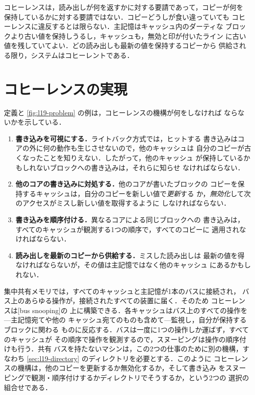 \documentclass[../main.tex]{subfiles}
\begin{document}
\begin{note}
  コヒーレンスは，読み出しが何を返すかに対する要請であって，コピーが何を
  保持しているかに対する要請ではない．コピーどうしが食い違っていても
  コヒーレンスに違反するとは限らない．主記憶はキャッシュ内のダーティな
  ブロックより古い値を保持しうるし，キャッシュも，無効と印が付いたライン
  に古い値を残していてよい．どの読み出しも最新の値を保持するコピーから
  供給される限り，システムはコヒーレントである．
\end{note}

\section{コヒーレンスの実現}
\label{sec:l19-achieving}

定義と \cref{fig:l19-problem} の例は，コヒーレンスの機構が何をしなければ
ならないかを示している．
\begin{enumerate}
  \item \textbf{書き込みを可視にする．}ライトバック方式では，ヒットする
    書き込みはコアの外に何の動作も生じさせないので，他のキャッシュは
    自分のコピーが古くなったことを知りえない．したがって，他のキャッシュ
    が保持しているかもしれないブロックへの書き込みは，それらに知らせ
    なければならない．
  \item \textbf{他のコアの書き込みに対処する．}他のコアが書いたブロックの
    コピーを保持するキャッシュは，自分のコピーを新しい値で\emph{更新}する
    か，\emph{無効化}して次のアクセスがミスし新しい値を取得するように
    しなければならない．
  \item \textbf{書き込みを順序付ける．}異なるコアによる同じブロックへの
    書き込みは，すべてのキャッシュが観測する1つの順序で，すべてのコピーに
    適用されなければならない．
  \item \textbf{読み出しを最新のコピーから供給する．}ミスした読み出しは
    最新の値を得なければならないが，その値は主記憶ではなく他のキャッシュ
    にあるかもしれない．
\end{enumerate}

集中共有メモリでは，すべてのキャッシュと主記憶が1本のバスに接続され，
バス上のあらゆる操作が，接続されたすべての装置に届く．そのため
コヒーレンスは[bus snooping]の
上に構築できる．各キャッシュはバス上のすべての操作を---主記憶宛てや他の
キャッシュ宛てのものも含めて---監視し，自分が保持するブロックに関わる
ものに反応する．バスは一度に1つの操作しか運ばず，すべてのキャッシュが
その順序で操作を観測するので，スヌーピングは操作の順序付けも行う．共有
バスを持たないマシンは，この2つの仕事のために別の機構，すなわち
\cref{sec:l19-directory} のディレクトリを必要とする．このように
コヒーレンスの機構は，他のコピーを更新するか無効化するか，そして書き込み
をスヌーピングで観測・順序付けするかディレクトリでそうするか，という2つの
選択の組合せである．
\end{document}

